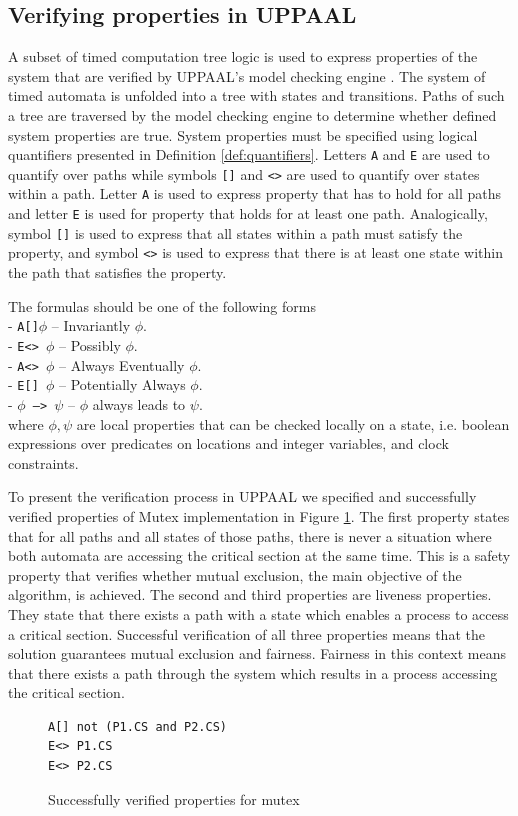 \subsection{Verifying properties in UPPAAL}
A subset of timed computation tree logic is used to express properties of the system that are verified by UPPAAL's model checking engine \cite{Bengtsson2004}. The system of timed automata is unfolded into a tree with states and transitions. Paths of such a tree are traversed by the model checking engine to determine whether defined system properties are true. System properties must be specified using logical quantifiers presented in Definition \ref{def:quantifiers}. Letters \texttt{A} and \texttt{E} are used to quantify over paths while symbols \texttt{[]} and \texttt{<>} are used to quantify over states within a path. Letter \texttt{A} is used to express property that has to hold for all paths and letter \texttt{E} is used for property that holds for at least one path. Analogically, symbol \texttt{[]} is used to express that all states within a path must satisfy the property, and symbol \texttt{<>} is used to express that there is at least one state within the path that satisfies the property.

\begin{definition}
The formulas should be one of the following forms\\
- \texttt{A[]$\phi$} -- Invariantly $\phi$.\\
- \texttt{E<> $\phi$} -- Possibly $\phi$.\\
- \texttt{A<> $\phi$} -- Always Eventually $\phi$.\\
- \texttt{E[] $\phi$} -- Potentially Always $\phi$.\\
- \texttt{$\phi$ --> $\psi$} -- $\phi$ always leads to $\psi$.\\
where $\phi, \psi$ are local properties that can be checked locally on a state, i.e. boolean expressions over predicates on locations and integer variables, and clock constraints.
\label{def:quantifiers}
\end{definition}

\noindent
To present the verification process in UPPAAL we specified and successfully verified properties of Mutex implementation in Figure \ref{fig:mutex_verification}. The first property states that for all paths and all states of those paths, there is never a situation where both automata are accessing the critical section at the same time. This is a safety property that verifies whether mutual exclusion, the main objective of the algorithm, is achieved. The second and third properties are liveness properties. They state that there exists a path with a state which enables a process to access a critical section. Successful verification of all three properties means that the solution guarantees mutual exclusion and fairness. Fairness in this context means that there exists a path through the system which results in a process accessing the critical section.

\begin{figure}[H]
\caption{Successfully verified properties for mutex \cite{SmallTutorial2009}}
\label{fig:mutex_verification}
\begin{lstlisting}[style=code]
A[] not (P1.CS and P2.CS)
E<> P1.CS
E<> P2.CS
\end{lstlisting}    
\end{figure}